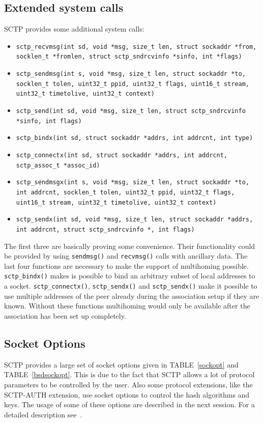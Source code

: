 \documentclass[conference]{IEEEtran}
\begin{document}
\subsection{Extended system calls}
SCTP provides some additional system calls:
\begin{itemize}
 \item  \texttt{sctp\_recvmsg(int sd, void *msg, size\_t len, struct sockaddr *from, socklen\_t *fromlen, struct sctp\_sndrcvinfo *sinfo, int *flags)}
 \item  \texttt{sctp\_sendmsg(int s, void *msg, size\_t len, struct sockaddr *to, socklen\_t tolen, uint32\_t ppid, uint32\_t flags, uint16\_t stream, uint32\_t timetolive, uint32\_t context)}
 \item  \texttt{sctp\_send(int sd, void *msg, size\_t len, struct sctp\_sndrcvinfo *sinfo, int flags)}
 \item  \texttt{sctp\_bindx(int sd, struct sockaddr *addrs, int addrcnt, int type)}
 \item  \texttt{sctp\_connectx(int sd, struct sockaddr *addrs, int addrcnt, sctp\_assoc\_t *assoc\_id)}
 \item  \texttt{sctp\_sendmsgx(int s, void *msg, size\_t len, struct sockaddr *to, int addrcnt, socklen\_t tolen, uint32\_t ppid, uint32\_t flags, uint16\_t stream, uint32\_t timetolive, uint32\_t context)}
 \item  \texttt{sctp\_sendx(int sd, void *msg, size\_t len, struct sockaddr *addrs, int addrcnt, struct sctp\_sndrcvinfo *, int flags)}
\end{itemize}
The first three are basically proving some convenience. Their functionality could be provided by
using \texttt{sendmsg()} and \texttt{recvmsg()} calls with ancillary data. The last four functions
are necessary to make the support of multihoming possible. \texttt{sctp\_bindx()} makes is
possible to bind an arbitrary subset of local addresses to a socket. \texttt{sctp\_connectx()},
\texttt{sctp\_sendx()} and \texttt{sctp\_sendx()} make it possible to use multiple addresses
of the peer already during the association setup if they are known. Without these functions
multihoming would only be available after the association has been set up completely.

\subsection{Socket Options}

SCTP provides a large set of socket options given in TABLE~\ref{sockopt} and TABLE~\ref{bsdsockopt}.
This is due to the fact that SCTP allows a lot of protocol parameters to be controlled by the
user. Also some protocol extensions, like the SCTP-AUTH extension, use socket options to
control the hash algorithms and keys. The usage of some of these options are described in the
next session. For a detailed description see~\cite{socketdraft}.
\end{document}
